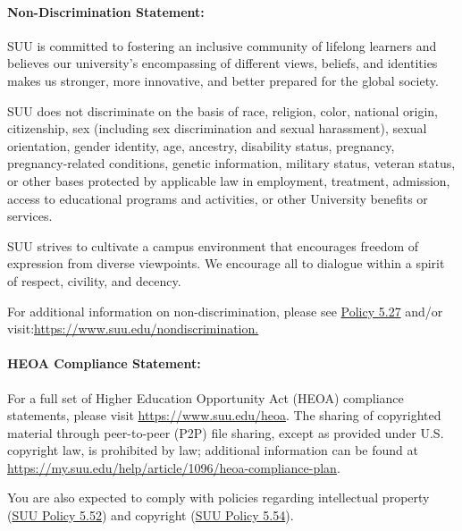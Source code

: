 \documentclass[12pt, letterpaper]{article}
\begin{document}
\paragraph{Non-Discrimination Statement:}
SUU is committed to fostering an inclusive community of lifelong learners and believes our university's encompassing of different views, beliefs, and identities makes us stronger, more innovative, and better prepared for the global society. 

\noindent
SUU does not discriminate on the basis of race, religion, color, national origin, citizenship, sex (including sex discrimination and sexual harassment), sexual orientation, gender identity, age, ancestry, disability status, pregnancy, pregnancy-related conditions, genetic information, military status, veteran status, or other bases protected by applicable law in employment, treatment, admission, access to educational programs and activities, or other University benefits or services.

\noindent
SUU strives to cultivate a campus environment that encourages freedom of expression from diverse viewpoints. We encourage all to dialogue within a spirit of respect, civility, and decency. 

\noindent
For additional information on non-discrimination, please see \href{https://www.suu.edu/policies/05/27.html}{Policy 5.27} and/or visit:\newline \href{https://www.suu.edu/nondiscrimination.}{https://www.suu.edu/nondiscrimination.}

\paragraph{HEOA Compliance Statement:}
For a full set of Higher Education Opportunity Act (HEOA) compliance statements, please visit \href{https://www.suu.edu/heoa}{https://www.suu.edu/heoa}. The sharing of copyrighted material through peer-to-peer (P2P) file sharing, except as provided under U.S. copyright law, is prohibited by law; additional information can be found at \newline\href{https://my.suu.edu/help/article/1096/heoa-compliance-plan}{https://my.suu.edu/help/article/1096/heoa-compliance-plan}.

\noindent
You are also expected to comply with policies regarding intellectual property (\href{https://www.suu.edu/policies/05/52.html}{SUU Policy 5.52}) and copyright (\href{https://www.suu.edu/policies/05/54.html}{SUU Policy 5.54}).
\end{document}
